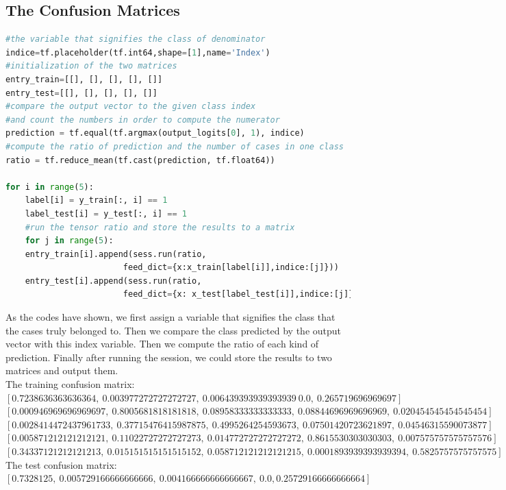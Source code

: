 \documentclass{article}
\begin{document}
\subsection{The Confusion Matrices}
\begin{lstlisting}[language=Python]
#the variable that signifies the class of denominator
indice=tf.placeholder(tf.int64,shape=[1],name='Index')
#initialization of the two matrices
entry_train=[[], [], [], [], []]
entry_test=[[], [], [], [], []]
#compare the output vector to the given class index
#and count the numbers in order to compute the numerator
prediction = tf.equal(tf.argmax(output_logits[0], 1), indice)
#compute the ratio of prediction and the number of cases in one class
ratio = tf.reduce_mean(tf.cast(prediction, tf.float64))

for i in range(5):
    label[i] = y_train[:, i] == 1
    label_test[i] = y_test[:, i] == 1
    #run the tensor ratio and store the results to a matrix
    for j in range(5):
    entry_train[i].append(sess.run(ratio,
                        feed_dict={x:x_train[label[i]],indice:[j]}))
    entry_test[i].append(sess.run(ratio,
                        feed_dict={x: x_test[label_test[i]],indice:[j]}))
\end{lstlisting}
As the codes have shown, we first assign a variable that signifies the class that the cases truly belonged to. Then we compare the class predicted by the output vector with this index variable. Then we compute the ratio of each kind of prediction. Finally after running the session, we could store the results to two matrices and output them.\\
The training confusion matrix:\\
$[0.7238636363636364,\ 0.003977272727272727,\ 0.006439393939393939\ 0.0,\ 0.265719696969697]$\\
$[0.000946969696969697,\ 0.8005681818181818,\ 0.08958333333333333,\ 0.08844696969696969,\ 0.020454545454545454]$\\ $[0.0028414472437961733,\ 0.37715476415987875,\ 0.4995264254593673,\ 0.07501420723621897,\ 0.04546315590073877]$\\ $[0.005871212121212121,\ 0.11022727272727273,\ 0.014772727272727272,\ 0.8615530303030303,\ 0.007575757575757576]$\\ $[0.34337121212121213,\ 0.015151515151515152,\ 0.058712121212121215,\ 0.0001893939393939394,\ 0.5825757575757575]$\\
The test confusion matrix:\\
$[0.7328125,\ 0.005729166666666666,\ 0.004166666666666667,\ 0.0, 0.25729166666666664]$\\
\end{document}
